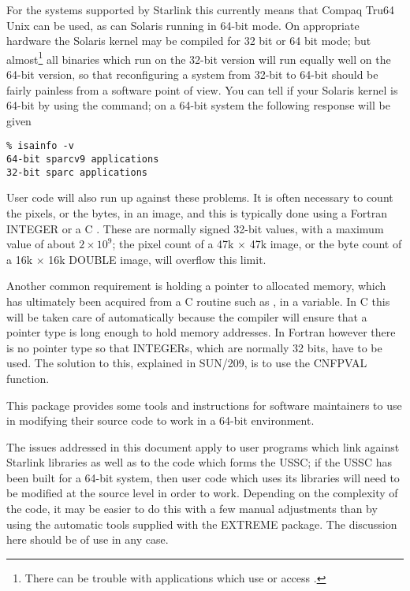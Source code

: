 \documentclass[twoside,11pt]{article}
\newcommand{\xref}[3]{#1}
\renewcommand{\_}{\texttt{\symbol{95}}}
\begin{document}
For the systems supported by
Starlink this currently means that Compaq Tru64 Unix can be used,
as can Solaris running in 64-bit mode.  
On appropriate hardware the Solaris kernel 
may be compiled for 32 bit or 64 bit mode;
but almost\footnote{
   There can be trouble with applications which use 
    or access .}
all binaries which run on the 32-bit version
will run equally well on the 64-bit version, 
so that reconfiguring a system from 32-bit to 64-bit should be
fairly painless from a software point of view.
You can tell if your Solaris kernel is 64-bit 
by using the  command; on a 64-bit system the
following response will be given
\begin{squote}
\begin{verbatim}
% isainfo -v
64-bit sparcv9 applications
32-bit sparc applications
\end{verbatim}
\end{squote}

User code will also run up against these problems.
It is often necessary to count the pixels, or the bytes,
in an image, and this is typically done using a Fortran INTEGER
or a C .  These are normally signed 32-bit values, with
a maximum value of about $2 \times 10^9$; the pixel count of a 
47k $\times$ 47k image, or the byte count of a 16k $\times$ 16k 
\_DOUBLE image, will overflow this limit.

Another common requirement is holding a pointer 
to allocated memory, which has ultimately been 
acquired from a C routine such as , 
in a variable.
In C this will be taken care of automatically because the compiler
will ensure that a pointer type is long enough to hold memory addresses.
In Fortran however there is no pointer type so that INTEGERs, which are
normally 32 bits, have to be used.
The solution to this, explained in \xref{SUN/209}{sun209}{pointers},
is to use the \xref{CNF\_PVAL}{sun209}{CNF\_PVAL} function.

This package provides some tools and instructions for 
software maintainers to use 
in modifying their source code to work in a 64-bit environment.

The issues addressed in this document apply to user programs which link
against Starlink libraries as well as to the code which forms the USSC;
if the USSC has been built for a 64-bit system, then user code 
which uses its libraries will need to be modified at the 
source level in order to work.
Depending on the complexity of the code, it may be easier to do this
with a few manual adjustments than by using the automatic 
tools supplied with the EXTREME package.  
The discussion here should be of use in any case.
\end{document}
